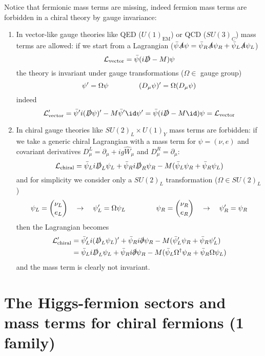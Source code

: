 \documentclass[TheoreticalPhy_ModB.tex]{subfiles}
\begin{document}
Notice that fermionic mass terms are missing, indeed fermion mass terms are forbidden in a chiral theory by gauge invariance:
\begin{enumerate}
\item In vector-like gauge theories like QED ($U(1)_{\text{EM}}$) or QCD ($SU(3)_C$) mass terms are allowed: if we start from a Lagrangian ($\bar\psi\slashed A\psi=\bar\psi_R\slashed A\psi_R+\bar\psi_L\slashed A\psi_L$)
\[\mathcal L_{\text{vector}}=\bar\psi(i\slashed D-M)\psi\]
the theory is invariant under gauge transformations ($\Omega\in$ gauge group)
\[\psi'=\Omega\psi\hspace{1.5cm}(D_\mu\psi)'=\Omega(D_\mu\psi)\]
indeed
\[\lag'_{\text{vector}}=\bar\psi'i(\slashed D\psi)'-M\bar\psi'\id\psi'=\bar\psi(i\slashed D-M\id)\psi=\lag_{\text{vector}}\]
\item In chiral gauge theories like $SU(2)_L\times U(1)_Y$ mass terms are forbidden: if we take a generic chiral Lagrangian with a mass term for $\psi=(\nu,e)$ and covariant derivatives $D^L_\mu=\partial_\mu+ig\hat W_\mu$ and $D^R_\mu=\partial_\mu$:
\[\mathcal L_{\text{chiral}}=\bar\psi_Li\slashed D_L\psi_L+\bar\psi_Ri\slashed D_R\psi_R-M(\bar\psi_L\psi_R+\bar\psi_R\psi_L)\]
and for simplicity we consider only a $SU(2)_L$ transformation ($\Omega\in SU(2)_L$)
\[\psi_L=\begin{pmatrix}\nu_L\\e_L\end{pmatrix}\quad\to\quad\psi_L'=\Omega\psi_L
\hspace{1.5cm}
\psi_R=\begin{pmatrix}\nu_R\\e_R\end{pmatrix}\quad\to\quad\psi_R'=\psi_R\]
then the Lagrangian becomes
\[\begin{aligned}
\mathcal L'_{\text{chiral}}&=\bar\psi_L'i(\slashed D_L\psi_L)'+\bar\psi_Ri\slashed \partial\psi_R-M(\bar\psi_L'\psi_R+\bar\psi_R\psi_L')\\
&=\bar\psi_Li\slashed D_L\psi_L+\bar\psi_Ri\slashed\partial\psi_R-M(\bar\psi_L\Omega^\dagger\psi_R+\bar\psi_R\Omega\psi_L)
\end{aligned}\]
and the mass term is clearly not invariant.
\end{enumerate}

\section{The Higgs-fermion sectors and mass terms for chiral fermions (1 family)}
\end{document}
